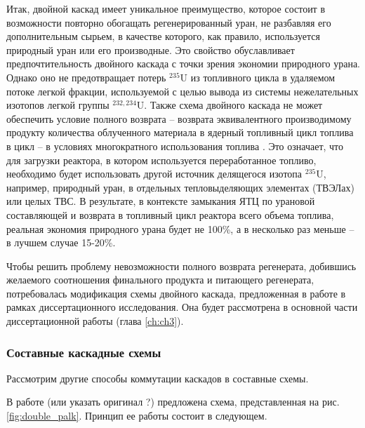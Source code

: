 
Итак, двойной каскад имеет уникальное преимущество, которое состоит в возможности повторно обогащать регенерированный уран, не разбавляя его дополнительным сырьем, в качестве которого, как правило, используется природный уран или его производные. Это свойство обуславливает предпочтительность двойного каскада с точки зрения экономии природного урана. Однако оно не предотвращает потерь $^{235}$U из топливного цикла в удаляемом потоке легкой фракции, используемой с целью вывода из системы нежелательных изотопов легкой группы $^{232,234}$U. Также схема двойного каскада не может обеспечить условие полного возврата -- возврата эквивалентного производимому продукту количества облученного материала в ядерный топливный цикл топлива в цикл -- в условиях многократного использования топлива \cite{smirnovObogashchenieRegenerirovannogoUrana2018}. Это означает, что для загрузки реактора, в котором используется переработанное топливо, необходимо будет использовать другой источник делящегося изотопа $^{235}$U, например, природный уран, в отдельных тепловыделяющих элементах (ТВЭЛах) или целых ТВС. В результате, в контексте замыкания ЯТЦ по урановой составляющей и возврата в топливный цикл реактора всего объема топлива, реальная экономия природного урана будет не 100\%, а в несколько раз меньше -- в лучшем случае 15-20\%.

Чтобы решить проблему невозможности полного возврата регенерата, добившись желаемого соотношения финального продукта и питающего регенерата, потребовалась модификация схемы двойного каскада, предложенная в работе \cite{smirnovObogashchenieRegenerirovannogoUrana2018} в рамках диссертационного исследования. Она будет рассмотрена в основной части диссертационной работы (глава \ref{ch:ch3}).

\subsubsection{Составные каскадные схемы}
Рассмотрим другие способы коммутации каскадов в составные схемы.

В работе \cite{OChISTKAREGENERIROVANNOGOURANA2013} (или указать оригинал \cite{palkinReprocessedUraniumPurification2013}?) предложена схема, представленная на рис. \ref{fig:double_palk}. Принцип ее работы состоит в следующем.

